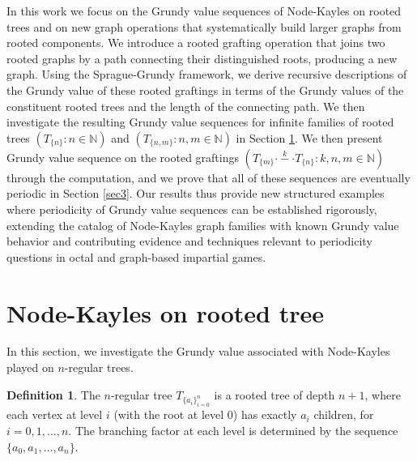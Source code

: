\documentclass[12pt]{elsarticle}
\newtheorem*{theorem A}{Theorem A}
\newtheorem*{theorem B}{N\"olker's Theorem}
\theoremstyle{remark}
\theoremstyle{remark}
\theoremstyle{definition}
\newtheorem{definition}{Definition}
\begin{document}
In this work we focus on the Grundy value sequences of Node-Kayles on rooted trees and on new graph operations that systematically build larger graphs from rooted components. We introduce a rooted grafting operation that joins two rooted graphs by a path connecting their distinguished roots, producing a new graph. Using the Sprague-Grundy framework, we derive recursive descriptions of the Grundy value of these rooted graftings in terms of the Grundy values of the constituent rooted trees and the length of the connecting path. We then investigate the resulting Grundy value sequences for infinite families of rooted trees $\left(T_{\{n\}}: n \in \mathbb{N}\right)$ and $\left(T_{\{n,m\}}: n,m \in \mathbb{N}\right)$ in Section \ref{sec2}. We then present Grundy value sequence on the rooted graftings $\left(T_{\{m\}} \stackrel{k}{\cdot - \cdot} T_{\{n\}} : k,n,m \in \mathbb{N}\right)$ through the computation, and we prove that all of these sequences are eventually periodic in Section \ref{sec3}. Our results thus provide new structured examples where periodicity of Grundy value sequences can be established rigorously, extending the catalog of Node-Kayles graph families with known Grundy value behavior and contributing evidence and techniques relevant to periodicity questions in octal and graph-based impartial games.

\section{Node-Kayles on rooted tree}\label{sec2}
In this section, we investigate the Grundy value associated with Node-Kayles played on $n$-regular trees.
\begin{definition}
	The $n$-regular tree $T_{\{a_i\}_{i=0}^{n}}$ is a rooted tree of depth $n+1$, where each vertex at level $i$ (with the root at level $0$) has exactly $a_{i}$ children, for $i = 0,1,\dots, n$. The branching factor at each level is determined by the sequence $\{a_0,a_1,\dots,a_n\}$.
\end{definition}
\end{document}
